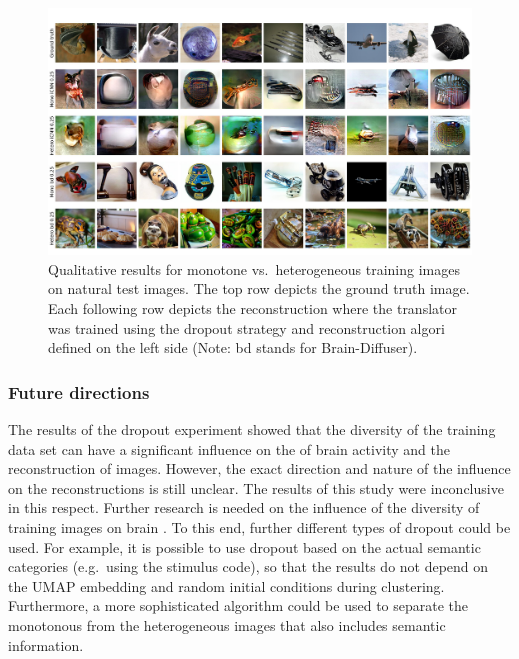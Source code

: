 \begin{figure}[ht]
  \centering
  \includegraphics[width=1\textwidth]{plots/dropout_discussion_test.JPEG}
  \caption[Reconstructed images monotone vs.\ heterogeneous training samples]{Qualitative results for monotone vs.\ heterogeneous training images on natural test images. The top row depicts the ground truth image. Each following row depicts the reconstruction where the translator was trained using the dropout strategy and reconstruction algori defined on the left side (Note: bd stands for Brain-Diffuser).}\label{fig:dropout_discussion_test}
\end{figure}

\subsubsection{Future directions}

The results of the dropout experiment showed that the diversity of the training data set can have a significant influence on the  of brain activity and the reconstruction of images. However, the exact direction and nature of the influence on the  reconstructions is still unclear. The results of this study were inconclusive in this respect. Further research is needed on the influence of the diversity of training images on brain . To this end, further different types of dropout could be used. For example, it is possible to use dropout based on the actual semantic categories (e.g.\ using the stimulus code), so that the results do not depend on the UMAP embedding and random initial conditions during clustering. Furthermore, a more sophisticated algorithm could be used to separate the monotonous from the heterogeneous images that also includes semantic information. 

